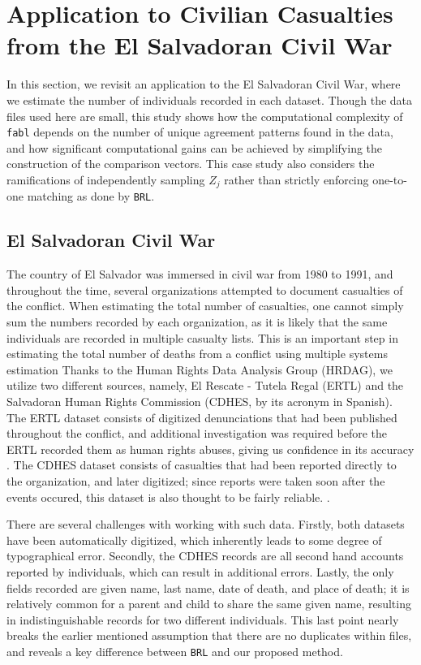 \documentclass[12pt,letterpaper]{article}
\newcommand{\1}[1]{\mathbb{I}\!\left[#1\right]} %
\begin{document}
\section{Application to Civilian Casualties from the El Salvadoran Civil War}
\label{sec:case-studies}

In this section, we revisit an application to the El Salvadoran Civil War, where we estimate the number of individuals recorded in each dataset. Though the data files used here are small, this study shows how the computational complexity of \texttt{fabl} depends on the number of unique agreement patterns found in the data, and how significant computational gains can be achieved by simplifying the construction of the comparison vectors. This case study also considers the ramifications of independently sampling $Z_j$ rather than strictly enforcing one-to-one matching as done by \texttt{BRL}. 

\subsection{El Salvadoran Civil War}
\label{el_salvador}

The country of El Salvador was immersed in civil war from 1980 to 1991,
and throughout the time, several organizations attempted to document
casualties of the conflict. When estimating the total number of
casualties, one cannot simply sum the numbers recorded by each
organization, as it is likely that the same individuals are recorded in
multiple casualty lists. This is an important step in estimating the total number of deaths from a conflict using multiple systems estimation \citep{lum2013applications} Thanks to the Human Rights Data Analysis Group (HRDAG), we utilize 
two different sources, namely,  El Rescate - Tutela
Regal (ERTL) and the Salvadoran Human Rights Commission (CDHES, by its
acronym in Spanish). The ERTL dataset consists of digitized denunciations that
had been published throughout the conflict, and additional investigation was required before the ERTL recorded them as human rights abuses, giving us confidence in its accuracy \cite{howland2008rescate}. The CDHES dataset consists
of casualties that had been reported directly to the organization, and
later digitized; since reports were taken soon after the events occured, this dataset is also thought to be fairly reliable. \cite{ball2000salvadoran}.

There are several challenges with working with such data. Firstly, both
datasets have been automatically digitized, which inherently leads to
some degree of typographical error. Secondly, the CDHES records are all
second hand accounts reported by individuals, which can result in
additional errors. Lastly, the only fields recorded are given name, last
name, date of death, and place of death; it is relatively common for a
parent and child to share the same given name, resulting in
indistinguishable records for two different individuals. This last point
nearly breaks the earlier mentioned assumption that there are no
duplicates within files, and reveals a key difference between
\texttt{BRL} and our proposed method.
\end{document}
